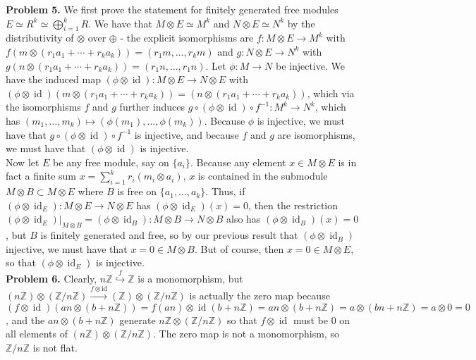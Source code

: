 \documentclass[11pt]{article}
\newcommand{\num}[1]{\noindent \textbf{#1}}
\newcommand{\id}{\operatorname{id}}
\theoremstyle{definition}
\begin{document}
\num{Problem 5.} We first prove the statement for finitely generated free
modules $E\simeq R^k\simeq\bigoplus_{i=1}^k R$. We have that $M\otimes
E\simeq M^k$ and $N\otimes E\simeq N^k$ by the distributivity of $\otimes$
over $\oplus$ - the explicit isomorphisms are $f:M\otimes E\rightarrow
M^k$ with $f(m\otimes(r_1a_1+\cdots+r_ka_k))=(r_1m,\ldots,r_km)$
and $g:N\otimes E\rightarrow N^k$ with
$g(n\otimes(r_1a_1+\cdots+r_ka_k))=(r_1n,\ldots,r_1n)$. Let
$\phi:M\rightarrow N$ be injective. We have the induced
map $(\phi\otimes\id):M\otimes E\rightarrow N\otimes E$ with
$(\phi\otimes\id)(m\otimes(r_1a_1+\cdots+r_ka_k))=(n\otimes(r_1a_1+\cdots+r_ka_k))$,
which via the isomorphisms $f$ and $g$ further induces
$g\circ(\phi\otimes\id)\circ f^{-1}:M^k\rightarrow N^k$, which has
$(m_1,\ldots,m_k)\mapsto(\phi(m_1),\ldots,\phi(m_k))$. Because $\phi$
is injective, we must have that $g\circ(\phi\otimes\id)\circ f^{-1}$ is
injective, and because $f$ and $g$ are isomorphisms, we must have that
$(\phi\otimes\id)$ is injective.\\

\noindent Now let $E$ be any free module, say on $\{a_i\}$. Because any element
$x\in M\otimes E$ is in fact a finite sum $x=\sum_{i=1}^k r_i(m_i\otimes
a_i)$, $x$ is contained in the submodule $M\otimes B\subset M\otimes E$ where
$B$ is free on $\{a_1,\ldots,a_k\}$. Thus, if $(\phi\otimes\id_E):M\otimes
E\rightarrow N\otimes E$ has $(\phi\otimes\id_E)(x)=0$, then the restriction
$(\phi\otimes\id_E)\vert_{M\otimes B}=(\phi\otimes\id_B):M\otimes B\rightarrow
N\otimes B$ also has $(\phi\otimes\id_B)(x)=0$, but $B$ is finitely generated
and free, so by our previous result that $(\phi\otimes\id_B)$ injective, we
must have that $x=0\in M\otimes B$. But of course, then $x=0\in M\otimes E$,
so that $(\phi\otimes\id_E)$ is injective.  \\

\num{Problem 6.} Clearly,
$n\mathbb{Z}\stackrel{f}{\hookrightarrow}\mathbb{Z}$ is a monomorphism, but
$(n\mathbb{Z})\otimes(\mathbb{Z}/n\mathbb{Z})\stackrel{f\otimes\text{id}}{\rightarrow}(\mathbb{Z})\otimes(\mathbb{Z}/n\mathbb{Z})$
is actually the zero map because $(f\otimes\id)(an\otimes
(b+n\mathbb{Z}))=f(an)\otimes\id(b+n\mathbb{Z})=an\otimes(b+n\mathbb{Z})=a\otimes
(bn+n\mathbb{Z})=a\otimes 0=0$, and the $an\otimes(b+n\mathbb{Z})$ generate
$n\mathbb{Z}\otimes(\mathbb{Z}/n\mathbb{Z})$ so that $f\otimes\id$ must be 0
on all elements of $(n\mathbb{Z})\otimes(\mathbb{Z}/n\mathbb{Z})$. The zero
map is not a monomorphism, so $\mathbb{Z}/n\mathbb{Z}$ is not flat.   \\
\end{document}
